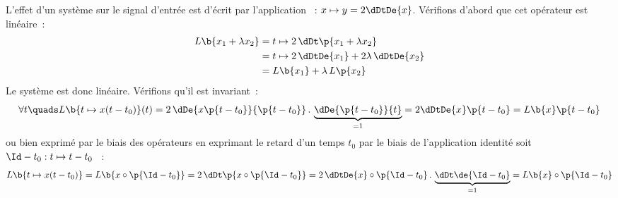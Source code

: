 \begin{exemple}
  L'effet d'un système sur le signal d'entrée est d'écrit par
  l'application ~: $x \mapsto y=2\dDtDe{x}$.  Vérifions
  d'abord que cet opérateur est linéaire~:
  \begin{eqnarray*}
    L\b{x_1+\lambda x_2} &= t \mapsto 2\, \dDt\p{x_1+\lambda x_2}\\
                         &= t \mapsto 2\,\dDtDe{x_{1}} + 2\lambda\,\dDtDe{x_{2}}\\
                         &= L\b{x_{1}}+\lambda\,L\p{x_{2}}
  \end{eqnarray*}
  Le système est donc linéaire. Vérifions qu'il est
  invariant~:
  \begin{equation*}
    \forall t \quads L\b{t\mapsto x(t-t_{0})}(t) =2\,\dDe{x\p{t-t_0}}{\p{t-t_0}}\,.\,\underbrace{\dDe{\p{t-t_0}}{t}}_{=1}=2\dDtDe{x}\p{t-t_0}=L\b{x}\p{t-t_0}
  \end{equation*}
  ou bien exprimé par le biais des opérateurs en exprimant le
  retard d'un temps $t_0$ par le biais de l'application
  identité soit $\Id-t_0 : t \mapsto t - t_0$ ~:
  \begin{equation*}
    L\b{t\mapsto x(t-t_{0})} = L\b{x \circ \p{\Id-t_0}}=2\,\dDt\p{x\circ\p{\Id -t_{0}}}=2\,\dDtDe{x}\circ\p{\Id-t_0}\,.\,\underbrace{\dDt\de{\Id-t_0}}_{=1}=L\b{x}\circ\p{\Id-t_0}
  \end{equation*}
\end{exemple}


